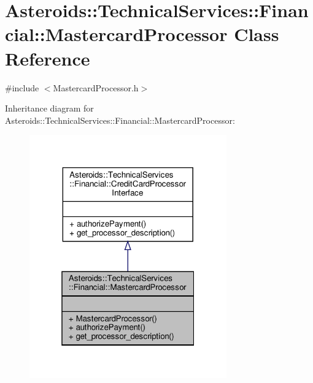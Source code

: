 \hypertarget{classAsteroids_1_1TechnicalServices_1_1Financial_1_1MastercardProcessor}{}\section{Asteroids\+:\+:Technical\+Services\+:\+:Financial\+:\+:Mastercard\+Processor Class Reference}
\label{classAsteroids_1_1TechnicalServices_1_1Financial_1_1MastercardProcessor}


{\ttfamily \#include $<$Mastercard\+Processor.\+h$>$}



Inheritance diagram for Asteroids\+:\+:Technical\+Services\+:\+:Financial\+:\+:Mastercard\+Processor\+:\nopagebreak
\begin{figure}[H]
\begin{center}
\leavevmode
\includegraphics[width=241pt]{classAsteroids_1_1TechnicalServices_1_1Financial_1_1MastercardProcessor__inherit__graph}
\end{center}
\end{figure}


